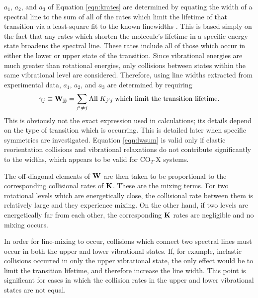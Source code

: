 \documentclass[11pt]{article}
\begin{document}
$a_{1}$, $a_{2}$, and $a_{3}$ of Equation \ref{eqn:krates} are determined 
by equating the width of a spectral line to the sum of all of the rates
which limit the lifetime of that transition via a least-square fit to the
known linewidths \cite{tob:93}.  This is based simply on the fact that
any rates which shorten the molecule's lifetime in a specific energy 
state broadens the spectral line.  These rates include all of those 
which occur in 
either the lower or upper state of the transition.  Since
vibrational energies are much greater than rotational energies, only
collisions between states within the same vibrational level are considered.
Therefore, using line widths extracted from experimental data, $a_{1}$,
$a_{2}$, and $a_{3}$ are determined by requiring
\begin{equation} \gamma_{j} \equiv {\bf W_{jj}} = \sum_{j'\neq j}
\mbox{All} \; K_{j'j} \; \mbox{which limit the transition lifetime}.
\label{eqn:lwsum}
\end{equation}
This is obviously not the exact expression used in calculations;
its details depend on the type of transition which is occurring.  This is
detailed later when specific symmetries are investigated.  
Equation \ref{eqn:lwsum} is valid only if elastic reorientation collisions 
and vibrational relaxations do not contribute significantly to the 
widths, which appears to be valid for CO$_{2}$-X systems.

The off-diagonal elements of ${\bf W}$ are then taken to be proportional 
to the corresponding collisional rates of ${\bf K}$.  These are the 
mixing terms.
For two rotational levels which are energetically close, the collisional 
rate between them is relatively large and they experience mixing.  On the 
other hand, if two levels are energetically far from each other, the 
corresponding ${\bf K}$ rates are negligible and no mixing occurs.

In order for line-mixing to occur, collisions which connect two spectral 
lines must occur in both the upper and lower vibrational states.  If, for
example, inelastic collisions occurred in only the upper vibrational state,
the only effect would be to limit the transition lifetime, and therefore
increase the line width.  
This point is significant for cases in which the collision rates in 
the upper and lower vibrational states are not equal.
\end{document}
